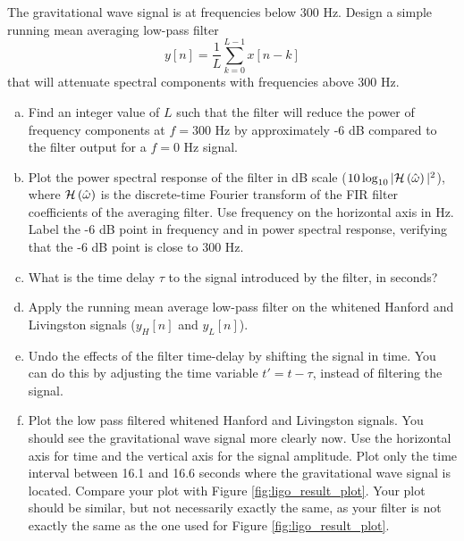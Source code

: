 The gravitational wave signal is at frequencies below 300 Hz. Design a simple running mean averaging low-pass filter
\begin{equation}
  y[n] = \frac{1}{L} \sum_{k=0}^{L-1}x[n-k]
\end{equation}
that will attenuate spectral components with frequencies above 300 Hz.
\begin{enumerate}[a)]
  \item Find an integer value of $L$ such that the filter will reduce the power of frequency
        components at $f=300$ Hz by approximately -6 dB compared to the filter output for a $f=0$ Hz signal.

  \item Plot the power spectral response of the filter in dB scale ($10\log_{10}|\mathcal{H}\left(\hat{\omega}\right)|^2$),
        where $\mathcal{H}\left(\hat{\omega}\right)$ is the discrete-time Fourier transform of the FIR filter coefficients of
        the averaging filter. Use frequency on the horizontal axis in Hz. Label the -6 dB point
        in frequency and in power spectral response, verifying that the -6 dB point is close to 300 Hz.

  \item What is the time delay $\tau$ to the signal introduced by the filter, in seconds?

  \item Apply the running mean average low-pass filter on the whitened
        Hanford and Livingston signals ($y_H[n]$ and $y_L[n]$).

  \item Undo the effects of the filter time-delay by shifting the signal in time.
        You can do this by adjusting the time variable $t'=t-\tau$, instead of filtering the signal.

  \item Plot the low pass filtered whitened Hanford and Livingston signals. You should see
        the gravitational wave signal more clearly now. Use the horizontal axis for time and
        the vertical axis for the signal amplitude. Plot only the time interval
        between 16.1 and 16.6 seconds where the gravitational wave signal is located.
        Compare your plot with Figure \ref{fig:ligo_result_plot}. Your plot should be similar,
        but not necessarily exactly the same, as your filter is not exactly the same as
        the one used for Figure \ref{fig:ligo_result_plot}.



\end{enumerate}

